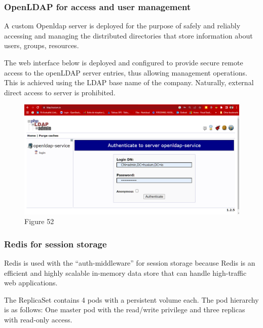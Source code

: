 \subsubsection{OpenLDAP for access and user management  }

\hspace{7mm}A custom Openldap server is deployed for the purpose of safely and reliably accessing and managing the distributed directories that store information about users, groups, resources. 

\hspace{7mm}The web interface below is deployed and configured to provide secure remote access to the openLDAP server entries, thus allowing management operations. This is achieved using the LDAP base name of the company. Naturally, external direct access to server is prohibited.

\begin{figure}[H]\centering
\includegraphics[width=1.0\textwidth,angle=00]{assets/f52.png}
\caption{Figure 52 }
\label{fig:f52}
\end{figure} 

\subsubsection{Redis for session storage }

\hspace{7mm}Redis is used with the “auth-middleware” for session storage because Redis is an efficient and highly scalable in-memory data store that can handle high-traffic web applications. 

\hspace{7mm}The ReplicaSet contains 4 pods with a persistent volume each. The pod hierarchy is as follows: One master pod with the read/write privilege and three replicas with read-only access.

